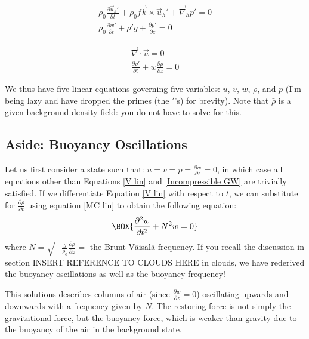 \begin{minipage}{0.48\linewidth}
    \begin{align}
        \label{H lin}
        \boxed{\rho_0\frac{\partial \vec{u}_h'}{\partial t}+\rho_0 f\vec{k}\times\vec{u}_h' +\vec{\nabla}_h p' =0}
        \\
        \label{V lin}
        \boxed{\rho_0 \frac{\partial w'}{\partial t} + \rho' g +\frac{\partial p'}{\partial z}=0}
    \end{align}
\end{minipage}
\hfill
\begin{minipage}{0.48\linewidth}
    \begin{align}
        \label{Incompressible GW}
        \boxed{\vec{\nabla}\cdot\vec{u}=0}
        \\
        \label{MC lin}
        \boxed{\frac{\partial \rho'}{\partial t} + w \frac{\partial \bar{\rho}}{\partial z}=0}
    \end{align}
\end{minipage}

\vspace{2mm} We thus have five linear equations governing five variables: $u$, $v$, $w$, $\rho$, and $p$ (I'm being lazy and have dropped the primes (the $'$'s) for brevity). Note that $\bar{\rho}$ is a given background density field: you do not have to solve for this.

\subsection{Aside: Buoyancy Oscillations}

Let us first consider a state such that: $u=v=p=\frac{\partial w}{\partial z}=0$, in which case all equations other than Equations \ref{V lin} and \ref{Incompressible GW} are trivially satisfied. If we differentiate Equation \ref{V lin} with respect to $t$, we can substitute for $\frac{\partial \rho}{\partial t}$ using equation \ref{MC lin} to obtain the following equation:
\begin{align}
    \BOX{\frac{\partial^2 w}{\partial t^2}+N^2 w = 0}
\end{align}
where $N = \sqrt{-\frac{g}{\rho_0}\frac{\partial \bar{\rho}}{\partial z}}=$ the Brunt-Väisälä frequency. If you recall the discussion in section INSERT REFERENCE TO CLOUDS HERE in clouds, we have rederived the buoyancy oscillations as well as the buoyancy frequency!

This solutions describes columns of air (since $\frac{\partial w}{\partial z}=0$) oscillating upwards and downwards with a frequency given by $N$. The restoring force is not simply the gravitational force, but the buoyancy force, which is weaker than gravity due to the buoyancy of the air in the background state.

